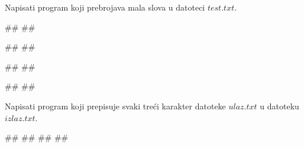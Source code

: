 \begin{Exercise}[label=p3_01] 
Napisati program koji prebrojava mala slova u datoteci $test.txt$. 

\begin{miditest}
\begin{upotreba}{1}
##
##

#\naslovIzlaz#
##
\end{upotreba}
\end{miditest}
\begin{miditest}
\begin{upotreba}{2}
##
##

#\naslovIzlaz#
##
\end{upotreba}
\end{miditest}
\end{Exercise}
\begin{Answer}[ref=p3_01]
\end{Answer}

\begin{Exercise}[label=p3_02] 
Napisati program koji prepisuje svaki treći karakter datoteke $ulaz.txt$ u datoteku $izlaz.txt$.\\
\begin{miditest}
\begin{upotreba}{1}
##
##
##
##
\end{upotreba}
\end{miditest}

\end{Exercise}
\begin{Answer}[ref=p3_02]
\end{Answer}

